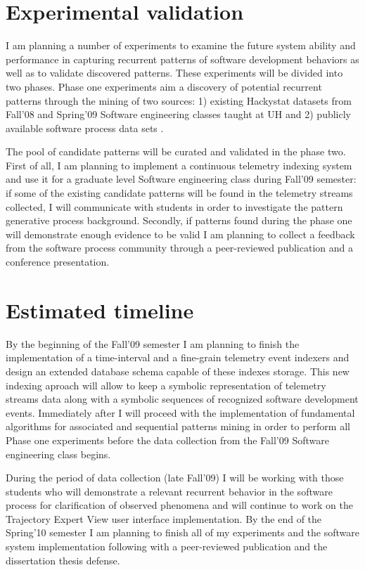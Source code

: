 \documentclass[11pt,oneside]{article}
\begin{document}
\section{Experimental validation}
I am planning a number of experiments to examine the future system ability and performance in capturing recurrent patterns of software development behaviors as well as to validate discovered patterns. These experiments will be divided into two phases. Phase one experiments aim a discovery of potential recurrent patterns through the mining of two sources: 1) existing Hackystat datasets from Fall'08 and Spring'09 Software engineering classes taught at UH and 2) publicly available software process data sets \cite{Sayyad-Shirabad+Menzies:2005}. 
	
The pool of candidate patterns will be curated and validated in the phase two. First of all, I am planning to implement a continuous telemetry indexing system and use it for a graduate level Software engineering class during Fall'09 semester: if some of the existing candidate patterns will be found in the telemetry streams collected, I will communicate with students in order to investigate the pattern generative process background. Secondly, if patterns found during the phase one will demonstrate enough evidence to be valid I am planning to collect a feedback from the software process community through a peer-reviewed publication and a conference presentation.

\section{Estimated timeline}
By the beginning of the Fall'09 semester I am planning to finish the implementation of a time-interval and a fine-grain telemetry event indexers and design an extended database schema capable of these indexes storage. This new indexing aproach will allow to keep a symbolic representation of telemetry streams data along with a symbolic sequences of recognized software development events. Immediately after I will proceed with the implementation of fundamental algorithms for associated and sequential patterns mining in order to perform all Phase one experiments before the data collection from the Fall'09 Software engineering class begins.

During the period of data collection (late Fall'09) I will be working with those students who will demonstrate a relevant recurrent behavior in the software process for clarification of observed phenomena and will continue to work on the Trajectory Expert View user interface implementation. By the end of the Spring'10 semester I am planning to finish all of my experiments and the software system implementation following with a peer-reviewed publication and the dissertation thesis defense.



\end{document}
